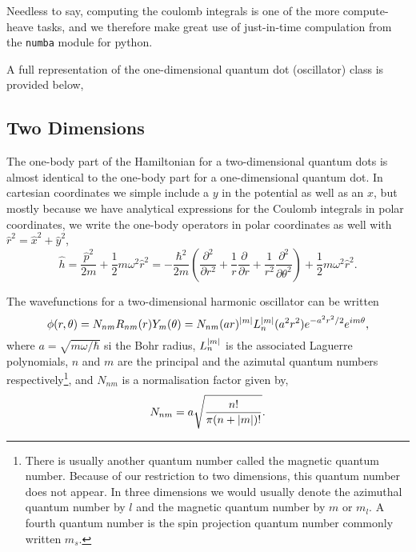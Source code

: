 Needless to say, computing the coulomb integrals is one of the more compute-heave tasks,
and we therefore make great use of just-in-time compulation from the \lstinline{numba} 
module for python.

A full representation of the one-dimensional quantum dot (oscillator) class is provided 
below,


\subsection{Two Dimensions}

The one-body part of the Hamiltonian for a two-dimensional quantum dots is almost
identical to the one-body part for a one-dimensional quantum dot. In cartesian
coordinates we simple include a $y$ in the potential as well as an $x$, but mostly 
because we have analytical expressions for the Coulomb integrals in polar
coordinates\cite{anisimovas1998energy}, we write the one-body operators in 
polar coordinates as well with $\hat{r}^2 = \hat{x}^2 + \hat{y}^2$,
\begin{equation}
    \hat{h} = \frac{\hat{p}^2}{2m} + \frac{1}{2}m\omega^2\hat{r}^2
        = - \frac{\hbar^2}{2m}\left(
            \frac{\partial^2}{\partial r^2}
            + \frac{1}{r} \frac{\partial}{\partial r}
            + \frac{1}{r^2} \frac{\partial^2}{\partial \theta^2}
        \right)
        + \frac{1}{2}m\omega^2\hat{r}^2.
\end{equation}

The wavefunctions for a two-dimensional harmonic oscillator can be
written
\begin{equation}
    \label{eq:2d_ho_eigenstate}
    \phi(r,\theta) = N_{nm} R_{nm}(r) Y_m(\theta) = N_{nm} (ar)^{\abs{m}} L_n^{\abs{m}}(a^2r^2)
        e^{-a^2r^2/2} e^{im\theta},
\end{equation}
where $a=\sqrt{m\omega/\hbar}$ si the Bohr radius, $L^{\abs{m}}_n$ is 
the associated Laguerre polynomials, $n$ and $m$ are the principal and
the azimutal quantum numbers respectively\footnote{There is usually another quantum 
number called the magnetic quantum number. Because of our restriction to two dimensions,
this quantum number does not appear. In three dimensions we would usually denote the azimuthal
quantum number by $l$ and the magnetic quantum number by $m$ or $m_l$. A fourth quantum 
number is the spin projection quantum number commonly written $m_s$.}, and $N_{nm}$ is a normalisation 
factor given by,
\begin{equation}
    N_{nm} = a\sqrt{\frac{n!}{\pi(n + \abs{m})!}}.
\end{equation}


